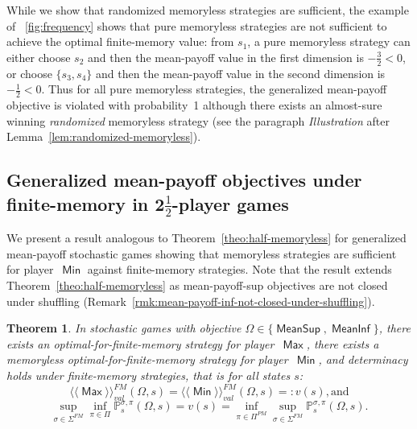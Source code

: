 \documentclass{article}
\newtheorem{theorem}{Theorem}
\newcommand{\half}{$\frac{\text{1}}{\text{2}}$}
\newcommand{\winval}[1]{\langle \! \langle #1 \rangle\! \rangle_{\mathit{val}} }
\newcommand{\vaf}{\winval{\ma}^{{FM}}}
\newcommand{\vbf}{\winval{\mi}^{{FM}}}
\newcommand{\straa}{\sigma}
\newcommand{\Straa}{\Sigma}
\newcommand{\strab}{\pi}
\newcommand{\Strab}{\Pi}
\DeclareMathOperator{\ma}{\mathsf{Max}}
\DeclareMathOperator{\mi}{\mathsf{Min}}
\newcommand{\prob}[1]{\mathbb{P}_{#1}}
\newcommand{\MeanSup}{\operatorname{\mathsf{MeanSup}}}
\newcommand{\MeanInf}{\operatorname{\mathsf{MeanInf}}}
\begin{document}
While we show that randomized memoryless strategies are sufficient, 
the example of \figurename~\ref{fig:frequency} shows that pure memoryless
strategies are not sufficient to achieve the optimal finite-memory value:
from $s_1$, a pure memoryless strategy can either choose $s_2$ and then the
mean-payoff value in the first dimension is $-\frac{3}{2} < 0$, or choose $\{s_3,s_4\}$
and then the mean-payoff value in the second dimension is $-\frac{1}{2} < 0$. 
Thus for all pure memoryless strategies, the generalized mean-payoff objective is
violated with probability~1 although there exists an almost-sure
winning \emph{randomized} memoryless strategy (see the paragraph {\em Illustration} 
after Lemma~\ref{lem:randomized-memoryless}).



\subsection{Generalized mean-payoff objectives under finite-memory in 2\half-player games}

We present a result analogous to Theorem~\ref{theo:half-memoryless} 
for generalized mean-payoff stochastic games showing that memoryless strategies are sufficient
for player~$\mi$ against finite-memory strategies. Note that the result extends Theorem~\ref{theo:half-memoryless}
as mean-payoff-sup objectives are not closed under shuffling 
(Remark~\ref{rmk:mean-payoff-inf-not-closed-under-shuffling}).

\begin{theorem}\label{theo:half-memoryless-mean-payoff}
In stochastic games with objective $\Omega \in \{\MeanSup, \MeanInf\}$, 
there exists an optimal-for-finite-memory strategy for player~$\ma$, there exists a memoryless optimal-for-finite-memory strategy
for player~$\mi$, and determinacy holds under finite-memory strategies, that is for all states $s$:
$$\vaf(\Omega,s) = \vbf(\Omega,s) =: v(s), \text{and}$$
$$ \sup_{\straa \in \Straa^{FM}} \inf_{\strab \in \Strab} \prob{s}^{\straa,\strab}(\Omega,s) = v(s) = 
\inf_{\strab \in \Strab^{PM}} \sup_{\straa \in \Straa^{FM}} \prob{s}^{\straa,\strab}(\Omega,s).
$$
\end{theorem}
\end{document}

